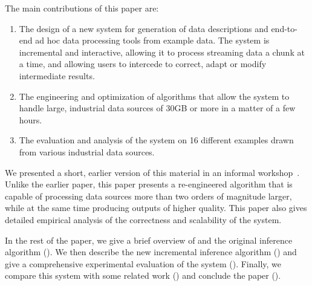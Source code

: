 The main contributions of this paper are:
\begin{enumerate}
\item The design of a new system for generation of data descriptions
and end-to-end ad hoc data processing tools from example data.  
The system is incremental and interactive, allowing it to process
streaming data a chunk at a time, and allowing users to intercede
to correct, adapt or modify intermediate results. 
\item The engineering and optimization of algorithms that allow
the system to handle large, industrial data sources of 30GB or
more in a matter of a few hours.
\item The evaluation and analysis of the system
on 16 different examples drawn from
various industrial data sources.
\end{enumerate}

We presented a short, earlier version of this material in an informal workshop~\cite{wasl09:zhu+}. 
Unlike the earlier paper, this paper presents a re-engineered algorithm
that is capable of processing data sources more than two orders of magnitude
larger, while at the same time producing outputs of higher quality. 
This paper also gives detailed empirical analysis of the 
correctness and scalability of the system.

In the rest of the paper, we give a brief overview of \pads{} and the original
\learnpads{} inference algorithm (). We then describe
the new incremental inference algorithm ()
and give a comprehensive experimental
evaluation of the system (). Finally, we compare this
system with some related work () and conclude
the paper ().
